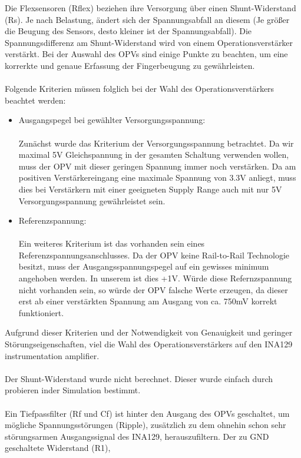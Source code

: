 \documentclass[11pt]{article}
\begin{document}
Die Flexsensoren (Rflex) beziehen ihre Versorgung über einen Shunt-Widerstand (Rs). Je nach Belastung, ändert sich der 
Spannungsabfall an diesem (Je größer die Beugung des Sensors, desto kleiner ist der Spannungsabfall). Die Spannungsdifferenz 
am Shunt-Widerstand wird von einem Operationsverstärker verstärkt. Bei der Auswahl des OPVs sind einige Punkte zu beachten, um 
eine korrerkte und genaue Erfassung der Fingerbeugung zu gewährleisten. \\
\\
Folgende Kriterien müssen folglich bei der Wahl des Operationsverstärkers beachtet werden:
\begin{itemize}
	\item Ausgangspegel bei gewählter Versorgungsspannung: \\
		  \\
		  Zunächst wurde das Kriterium der Versorgungsspannung betrachtet. Da wir maximal 5V Gleichspannung in der gesamten 
		  Schaltung verwenden wollen, muss der OPV mit dieser geringen Spannung immer noch verstärken. Da am positiven 
		  Verstärkereingang eine maximale Spannung von 3.3V anliegt, muss dies bei Verstärkern mit einer geeigneten Supply Range 
		  auch mit nur 5V Versorgungsspannung gewährleistet sein.
	\item Referenzspannung: \\
		  \\
		  Ein weiteres Kriterium ist das vorhanden sein eines Referenzspannungsanschlusses. Da der OPV keine Rail-to-Rail 
		  Technologie besitzt, muss der Ausgangsspannungspegel auf ein gewisses minimum angehoben werden. In unserem ist dies 
		  +1V. Würde diese Refernzspannung nicht vorhanden sein, so würde der OPV falsche Werte erzeugen, da dieser erst ab einer
		  verstärkten Spannung am Ausgang von ca. 750mV korrekt funktioniert.

\end{itemize}
Aufgrund dieser Kriterien und der Notwendigkeit von Genauigkeit und geringer Störungseigenschaften, viel die Wahl des 
Operationsverstärkers auf den INA129 instrumentation amplifier. \\
\\
Der Shunt-Widerstand wurde nicht berechnet. Dieser wurde einfach durch probieren inder Simulation bestimmt. \\
\\
Ein Tiefpassfilter (Rf und Cf) ist hinter den Ausgang des OPVs geschaltet, um mögliche Spannungsstörungen (Ripple), zusätzlich
zu dem ohnehin schon sehr störungsarmen Ausgangssignal des INA129, herauszufiltern. Der zu GND geschaltete Widerstand (R1), 
\end{document}
